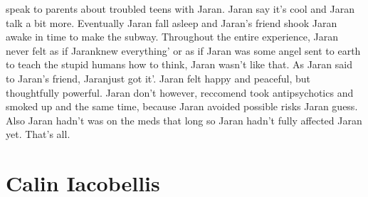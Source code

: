 \documentclass[12pt]{book}
\begin{document}
speak to parents about troubled teens with Jaran. Jaran say it's cool and Jaran talk a bit more. Eventually Jaran fall asleep and Jaran's friend shook Jaran awake in time to make the subway. Throughout the entire experience, Jaran never felt as if Jaranknew everything' or as if Jaran was some angel sent to earth to teach the stupid humans how to think, Jaran wasn't like that. As Jaran said to Jaran's friend, Jaranjust got it'. Jaran felt happy and peaceful, but thoughtfully powerful. Jaran don't however, reccomend took antipsychotics and smoked up and the same time, because Jaran avoided possible risks Jaran guess. Also Jaran hadn't was on the meds that long so Jaran hadn't fully affected Jaran yet. That's all.



\chapter{Calin Iacobellis}
\end{document}
